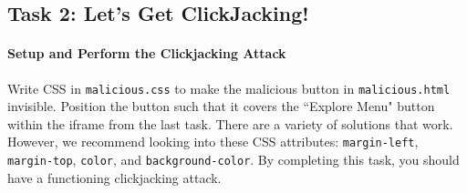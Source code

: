 
\subsection{Task 2: Let’s Get ClickJacking!}

\paragraph{Setup and Perform the Clickjacking Attack}
Write CSS in \texttt{malicious.css} to make the malicious button in \texttt{malicious.html} invisible. Position the button such that it covers the ``Explore Menu" button within the iframe from the last task. There are a variety of solutions that work. However, we recommend looking into these CSS attributes: \texttt{margin-left}, \texttt{margin-top}, \texttt{color}, and \texttt{background-color}. By completing this task, you should have a functioning clickjacking attack. 






